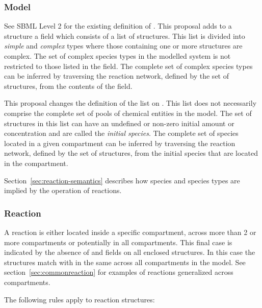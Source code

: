 \documentclass{cekarticle}
\begin{document}
\subsubsection{Model}

See SBML Level 2 for the existing definition of .
This proposal adds to a  structure a
 field which consists of a list of
 structures. This list is divided into
\emph{simple} and \emph{complex} types where those containing one
or more  structures are complex. The
set of complex species types in the modelled system is not
restricted to those listed in the  field. The
complete set of complex species types can be inferred by
traversing the reaction network, defined by the set of
 structures, from the contents of the
 field.

This proposal changes the definition of the  list
on . This list does not necessarily comprise the
complete set of pools of chemical entities in the model. The set
of  structures in this list can have an undefined
or non-zero initial amount or concentration and are called the
\emph{initial species}.  The complete set of species located in a
given compartment can be inferred by traversing the reaction
network, defined by the set of  structures, from
the initial species that are located in the compartment.

Section~\ref{sec:reaction-semantics} describes how species and
species types are implied by the operation of reactions.

\subsubsection{Reaction}
\label{sec:class-reaction}

A reaction is either located inside a specific compartment, across
more than 2 or more compartments or
 potentially in all compartments.  This final case is indicated by the absence of
 and  fields on all enclosed
 structures. In this case the
 structures match with
 in the same  across all
compartments in the model. See section~\ref{sec:commonreaction}
for examples of reactions generalized across compartments.

The following rules apply to reaction structures:
\end{document}
